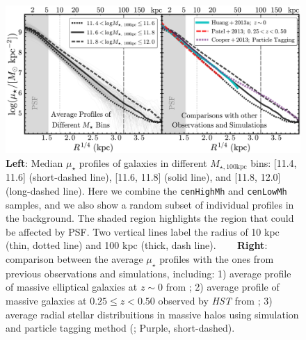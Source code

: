 \documentclass{emulateapj}
\def\rbcg{\texttt{cenHighMh}}
\def\nbcg{\texttt{cenLowMh}}
\def\mtot{{$M_{\star,100\mathrm{kpc}}$}}
\def\mden{{$\mu_{\star}$}}
\begin{document}
\begin{CJK*}{UTF8}{gbsn}
  \begin{figure}[bt!]
      \centering 
      \includegraphics[width=\textwidth]{fig/average_mass_profiles_fsps1_A}
      \caption{
      	\textbf{Left}: Median \mden{} profiles of galaxies in different \mtot{} bins:
      	[11.4, 11.6] (short-dashed line), [11.6, 11.8] (solid line), and 
      	[11.8, 12.0] (long-dashed line). 
      	Here we combine the \rbcg{} and \nbcg{} samples, and we also show a random subset 
      	of individual profiles in the background.
      	The shaded region highlights the region that could be affected by PSF.
        Two vertical lines label the radius of 10 kpc (thin, dotted line) and
        100 kpc (thick, dash line). ~~~ 
        \textbf{Right}: comparison between the average \mden{} profiles with the ones 
        from previous observations and simulations, including: 
        1) average profile of massive elliptical galaxies at $z\sim 0$ from 
        \citet[][Cyan, solid]{Huang2013a}; 
        2) average profile of massive galaxies at $0.25 \leq z < 0.50$ observed by 
        \textit{HST} from \citet[][Red, long-dashed]{Patel2013} ;
        3) average radial stellar distribuitions in massive halos using simulation and 
        particle tagging method (\citealt{Cooper13}; Purple, short-dashed).}
      \label{fig:avg_prof}
  \end{figure}


\end{CJK*}
\end{document}
